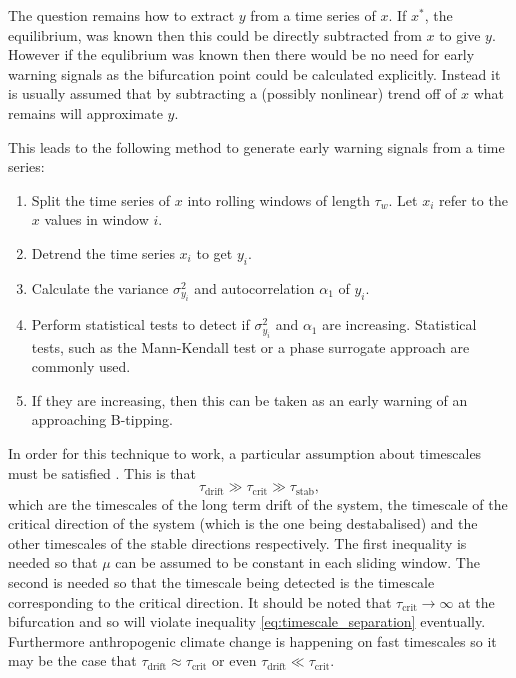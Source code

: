 The question remains how to extract $y$ from a time series of $x$. If $x^*$, the equilibrium, was known then this could be directly subtracted from $x$ to give $y$. However if the equlibrium was known
then there would be no need for early warning signals as the bifurcation point could be calculated explicitly. Instead it is usually assumed that by subtracting a (possibly nonlinear) trend
off of $x$ what remains will approximate $y$.

This leads to the following method to generate early warning signals from a time series:
\begin{enumerate}
\item Split the time series of $x$ into rolling windows of length $\tau_w$. Let $x_i$ refer to the $x$ values in window $i$.
\item Detrend the time series $x_i$ to get $y_i$.
\item Calculate the variance $\sigma^2_{y_i}$ and autocorrelation $\alpha_{1}$ of $y_i$.
\item Perform statistical tests to detect if $\sigma^2_{y_i}$ and  $\alpha_{1}$ are increasing. Statistical tests, such as the Mann-Kendall test \parencite{Wilks2019} or a phase
  surrogate approach \parencite{Boettner2022} are commonly used.
\item If they are increasing, then this can be taken as an early warning of an approaching B-tipping. 
\end{enumerate}

In order for this technique to work, a particular assumption about timescales must be satisfied \parencite{Thompson2011b}. This is that
\begin{equation}
  \label{eq:timescale_separation}
  \tau_{\mathrm{drift}} \gg \tau_{\mathrm{crit}} \gg \tau_{\mathrm{stab}},
\end{equation}
which are the timescales of the long term drift of the system, the timescale of the critical direction of the system (which is the one being destabalised) and the other timescales of the stable directions
respectively. The first inequality is needed so that $\mu$ can be assumed to be constant in each sliding window. The second is needed so that the timescale being detected is the timescale corresponding
to the critical direction. It should be noted that $\tau_{\mathrm{crit}} \rightarrow \infty$ at the bifurcation and so will
violate inequality \ref{eq:timescale_separation} eventually. Furthermore anthropogenic climate change is happening on fast
timescales so it may be the case that $\tau_{\mathrm{drift}} \approx \tau_{\mathrm{crit}}$ or even $\tau_{\mathrm{drift}} \ll \tau_{\mathrm{crit}}$.

